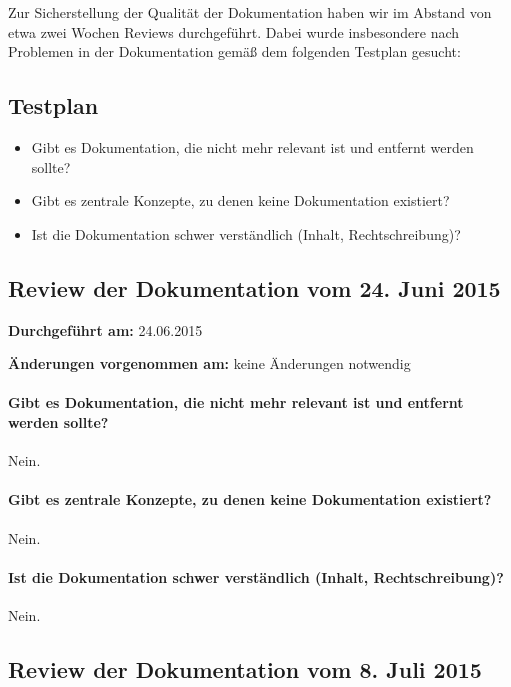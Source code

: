 

Zur Sicherstellung der Qualität der Dokumentation haben wir im Abstand von etwa zwei Wochen Reviews durchgeführt. Dabei wurde insbesondere nach Problemen in der Dokumentation gemäß dem folgenden Testplan gesucht:

\subsection{Testplan}

\begin{itemize}
\item Gibt es Dokumentation, die nicht mehr relevant ist und entfernt werden sollte?
\item Gibt es zentrale Konzepte, zu denen keine Dokumentation existiert?
\item Ist die Dokumentation schwer verständlich (Inhalt, Rechtschreibung)?
\end{itemize}




\subsection{Review der Dokumentation vom 24. Juni 2015}

\textbf{Durchgeführt am:} 24.06.2015

\textbf{Änderungen vorgenommen am:} keine Änderungen notwendig

\paragraph{Gibt es Dokumentation, die nicht mehr relevant ist und entfernt werden sollte?}
Nein.

\paragraph{Gibt es zentrale Konzepte, zu denen keine Dokumentation existiert?}
Nein.

\paragraph{Ist die Dokumentation schwer verständlich (Inhalt, Rechtschreibung)?}
Nein.


\subsection{Review der Dokumentation vom 8. Juli 2015}

